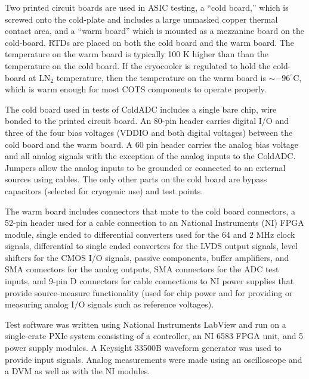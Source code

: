 Two printed circuit boards are used in ASIC testing, a ``cold board,'' which is screwed onto the cold-plate and includes a large unmasked copper thermal contact area, and a ``warm board'' which is mounted as a mezzanine board on the cold-board.  RTDs are placed on both the cold board and the warm board.  The temperature on the warm board is typically 100 K higher than than the temperature on the cold board.  If the cryocooler is regulated to hold the cold-board at LN$_2$ temperature, then the temperature on the warm board is $\sim-96^{\circ}$C, which is warm enough for most COTS components to operate properly.

The cold board used in tests of ColdADC includes a single bare chip, wire bonded to the printed circuit board.  An 80-pin header carries digital I/O and three of the four bias voltages (VDDIO and both digital voltages) between the cold board and the warm board.  A 60 pin header carries the analog bias voltage and all analog signals with the exception of the analog inputs to the ColdADC.  Jumpers allow the analog inputs to be grounded or connected to an external sources using cables.  The only other parts on the cold board are bypass capacitors (selected for cryogenic use) and test points.

The warm board includes connectors that mate to the cold board connectors, a 52-pin header used for a cable connection to an National Instruments (NI) FPGA module, single ended to differential converters used for the 64 and 2 MHz clock signals, differential to single ended converters for the LVDS output signals, level shifters for the CMOS I/O signals, passive components, buffer amplifiers, and SMA connectors for the analog outputs, SMA connectors for the ADC test inputs, and 9-pin D connectors for cable connections to NI power supplies that provide source-measure functionality (used for chip power and for providing or measuring analog I/O signals such as reference voltages).

Test software was written using National Instruments LabView and run on a single-crate PXIe system consisting of a controller, an NI 6583 FPGA unit, and 5 power supply modules.  A Keysight 33500B waveform generator was used to provide input signals.  Analog measurements were made using an oscilloscope and a DVM as well as with the NI modules.

